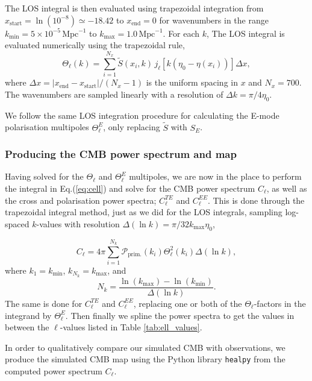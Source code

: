 \documentclass[twocolumn]{aa}
\begin{document}
The LOS integral is then evaluated using trapezoidal integration from $x_\text{start} = \ln(10^{-8}) \simeq -18.42$ to $x_\text{end} = 0$ for wavenumbers in the range $k_\text{min} = 5\times10^{-5}\,\text{Mpc}^{-1}$ to $k_\text{max} = 1.0\,\text{Mpc}^{-1}$. For each $k$, The LOS integral is evaluated numerically using the trapezoidal rule,
\begin{equation*}
      \Theta_\ell(k) = \sum_{i=1}^{N_x} \tilde{S}(x_i, k)\, j_\ell[k(\eta_0 - \eta(x_i))]\Delta x,
\end{equation*}
where $\Delta x = |x_\text{end}-x_\text{start}|/(N_x-1)$ is the uniform spacing in $x$ and $N_x=700$. The wavenumbers are sampled linearly with a resolution of $\Delta k=\pi/4\eta_0$. 

We follow the same LOS integration procedure for calculating the E-mode polarisation multipoles $\Theta_\ell^E$, only replacing $\tilde{S}$ with $S_E$.




\subsubsection{Producing the CMB power spectrum and map}
Having solved for the $\Theta_\ell$ and $\Theta_\ell^E$ multipoles, we are now in the place to perform the integral in Eq.(\ref{eq:cell}) and solve for the CMB power spectrum $C_\ell$, as well as the cross and polarisation power spectra; $C_\ell^{TE}$ and $C_\ell^{EE}$. This is done through the trapezoidal integral method, just as we did for the LOS integrals, sampling log-spaced $k$-values with resolution $\Delta(\ln k)=\pi/32k_\text{max}\eta_0$,

\begin{equation*}
      C_\ell = 4\pi \sum_{i=1}^{N_k} \mathcal{P}_\text{prim.}(k_i)\Theta_\ell^2(k_i)\Delta(\ln k),
\end{equation*}
where $k_1 = k_\text{min}$, $k_{N_k}=k_\text{max}$, and $$N_k =\frac{\ln(k_\text{max})-\ln(k_\text{min})}{\Delta(\ln k)}.$$ The same is done for $C_\ell^{TE}$ and $C_\ell^{EE}$, replacing one or both of the $\Theta_\ell$-factors in the integrand by $\Theta_\ell^E$. Then finally we spline the power spectra to get the values in between the $\ell$-values listed in Table \ref{tab:ell_values}.

In order to qualitatively compare our simulated CMB with observations, we produce the simulated CMB map using the Python library \verb|healpy| \citep{healpy1,healpy2} from the computed power spectrum $C_\ell$.
\end{document}
